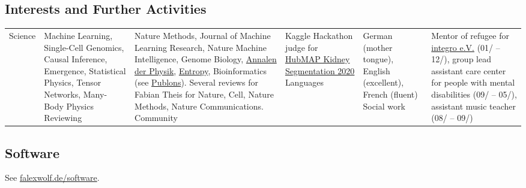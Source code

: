 \subsection*{Interests and Further Activities}\vspace{-1em}
\begin{longtable}[t]{R{\widthC} p{\widthB}}
Science
& Machine Learning, Single-Cell Genomics, Causal Inference, Emergence,  Statistical Physics, Tensor Networks, Many-Body Physics
\newline
Reviewing
& Nature Methods, Journal of Machine Learning Research, Nature Machine Intelligence, Genome Biology,  \href{https://en.wikipedia.org/wiki/Annalen_der_Physik}{Annalen der  Physik}, \href{https://en.wikipedia.org/wiki/Entropy_(journal)}{Entropy}, Bioinformatics (see \href{https://publons.com/author/1299815/f-alexander-wolf}{Publons}). Several reviews for Fabian Theis for Nature, Cell, Nature Methods, Nature Communications.
\newline
Community
& Kaggle Hackathon judge for \href{https://www.kaggle.com/c/hubmap-kidney-segmentation}{HubMAP Kidney Segmentation 2020}
\newline
Languages
& German (mother tongue), English (excellent), French (fluent)
\newline
Social work
& Mentor of refugee for \href{http://integro-ev.de/}{integro e.V.} (01/ -- 12/), group lead assistant care center for people with mental disabilities (09/ -- 05/), assistant music teacher (08/ -- 09/)
\end{longtable}

\subsection*{Software}
See \href{http://falexwolf.de/software/}{falexwolf.de/software}.

